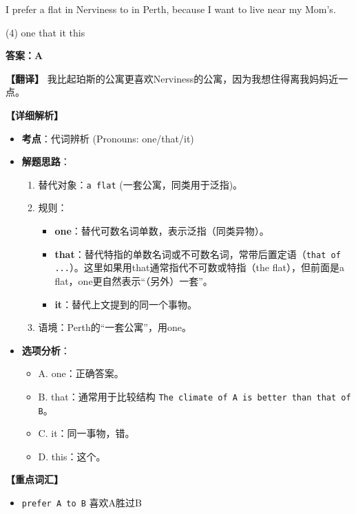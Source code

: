 \documentclass[11pt, a4paper]{article}
\newcommand{\analysis}[4]{
    \begin{solutionbox}
        \textbf{答案：#1}
        
        \textbf{【翻译】} #2
        
        \textbf{【详细解析】}
        #3
        
        \textbf{【重点词汇】}
        #4
    \end{solutionbox}
}
\newcommand{\blank}{\underline{\hspace{1.5cm}}}
\begin{document}
\begin{questions}
    \item I prefer a flat in Nerviness to \blank in Perth, because I want to live near my Mom's.
    \begin{tasks}(4)
        \task one \task that \task it \task this
    \end{tasks}
    \analysis{A}{我比起珀斯的公寓更喜欢Nerviness的公寓，因为我想住得离我妈妈近一点。}{
        \begin{itemize}
            \item \textbf{考点}：代词辨析 (Pronouns: one/that/it)
            \item \textbf{解题思路}：
                \begin{enumerate}
                    \item 替代对象：\texttt{a flat} (一套公寓，同类用于泛指)。
                    \item 规则：
                        \begin{itemize}
                            \item \textbf{one}：替代可数名词单数，表示泛指（同类异物）。
                            \item \textbf{that}：替代特指的单数名词或不可数名词，常带后置定语（\texttt{that of ...}）。这里如果用that通常指代不可数或特指（the flat），但前面是a flat，one更自然表示“（另外）一套”。
                            \item \textbf{it}：替代上文提到的同一个事物。
                        \end{itemize}
                    \item 语境：Perth的“一套公寓”，用one。
                \end{enumerate}
            \item \textbf{选项分析}：
                \begin{itemize}
                    \item A. one：正确答案。
                    \item B. that：通常用于比较结构 \texttt{The climate of A is better than that of B}。
                    \item C. it：同一事物，错。
                    \item D. this：这个。
                \end{itemize}
        \end{itemize}
    }{
        \begin{itemize}
            \item \texttt{prefer A to B} 喜欢A胜过B
        \end{itemize}
    }


\end{questions}
\end{document}
